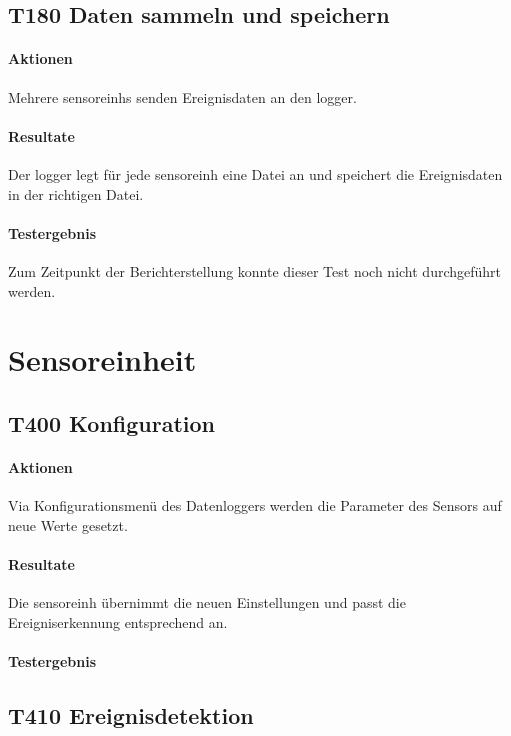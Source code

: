 \subsection{T180 Daten sammeln und speichern}
\paragraph{Aktionen} Mehrere \glspl{sensoreinh} senden Ereignisdaten an den \gls{logger}. 

\paragraph{Resultate} Der \gls{logger} legt für jede \gls{sensoreinh} eine Datei an und speichert die Ereignisdaten in der richtigen Datei.

\paragraph{Testergebnis} Zum Zeitpunkt der Berichterstellung konnte dieser Test noch nicht durchgeführt werden. 


\section{Sensoreinheit}
\subsection{T400 Konfiguration}
\paragraph{Aktionen} Via Konfigurationsmenü des Datenloggers werden die Parameter des Sensors auf neue Werte gesetzt. 

\paragraph{Resultate} Die \gls{sensoreinh} übernimmt die neuen Einstellungen und passt die Ereigniserkennung entsprechend an.

\paragraph{Testergebnis} 

\subsection{T410 Ereignisdetektion}
